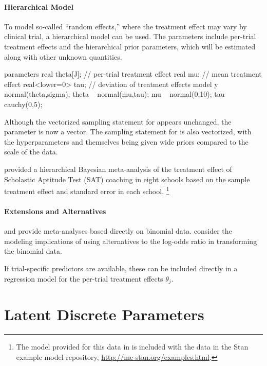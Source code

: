 \subsubsection{Hierarchical Model}

To model so-called ``random effects,'' where the treatment effect may
vary by clinical trial, a hierarchical model can be used.  The
parameters include per-trial treatment effects and the hierarchical
prior parameters, which will be estimated along with other unknown
quantities.  
%
\begin{stancode}
parameters {
  real theta[J];      // per-trial treatment effect
  real mu;            // mean treatment effect
  real<lower=0> tau;  // deviation of treatment effects
}
model {
  y ~ normal(theta,sigma);
  theta ~ normal(mu,tau);
  mu ~ normal(0,10);
  tau ~ cauchy(0,5);
}
\end{stancode}
%
Although the vectorized sampling statement for  appears
unchanged, the parameter  is now a vector.  The sampling
statement for  is also vectorized, with the
hyperparameters  and  themselves being given wide
priors compared to the scale of the data.

\citet{Rubin:1981} provided a hierarchical Bayesian meta-analysis of
the treatment effect of Scholastic Aptitude Test (SAT) coaching in
eight schools based on the sample treatment effect and standard error
in each school.%
%
\footnote{The model provided for this data in
\citep[Section~5.5]{GelmanEtAl:2013} is included with the
data in the Stan example model repository, 
\url{http://mc-stan.org/examples.html}.}

\subsubsection{Extensions and Alternatives}

\citet{SmithSpiegelhalterThomas:1995} and
\citet[Section~19.4]{GelmanEtAl:2013} provide
meta-analyses based directly on binomial data.
\citet{WarnThompsonSpiegelhalter:2002} consider the modeling
implications of using alternatives to the log-odds ratio in
transforming the binomial data.

If trial-specific predictors are available, these can be included
directly in a regression model for the per-trial treatment effects
$\theta_j$.


\chapter{Latent Discrete Parameters}\label{latent-discrete.chapter}

